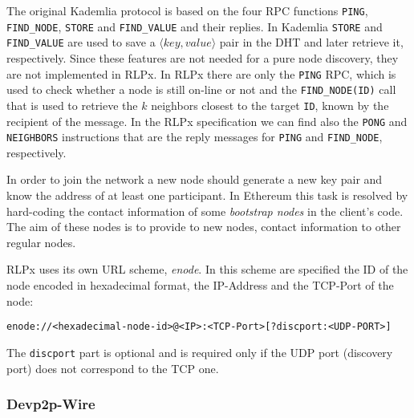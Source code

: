 The original Kademlia protocol is based on the four RPC functions 
\verb|PING|, \verb|FIND_NODE|,
\verb|STORE| and \verb|FIND_VALUE| and their replies.
In Kademlia \verb|STORE| and \verb|FIND_VALUE| are used to save a 
$\langle key, value\rangle$ pair in the DHT and later retrieve it, respectively.
Since these features are not needed for a pure node discovery, they
are not implemented in RLPx.
In RLPx there are only the \verb|PING| RPC, which is used to check whether a
node is still on-line or not and the \verb|FIND_NODE(ID)| call that is used to
retrieve the $k$ neighbors closest to the target \verb|ID|, known by the
recipient of the message. In the RLPx specification we can find also 
the \verb|PONG| and \verb|NEIGHBORS| instructions that are the reply messages
for \verb|PING| and \verb|FIND_NODE|, respectively.

In order to join the network a new node should generate a new key pair and
know the address of at least one participant.
In Ethereum this task is resolved by hard-coding the contact information
of some \textit{bootstrap nodes} in the client's code.
The aim of these nodes is to provide to new nodes, contact information to
other regular nodes.

RLPx uses its own URL scheme, \emph{enode}.
In this scheme are specified the ID of the node encoded in hexadecimal format,
the IP-Address and the TCP-Port of the node: 
\begin{verbatim}
enode://<hexadecimal-node-id>@<IP>:<TCP-Port>[?discport:<UDP-PORT>]
\end{verbatim} 
The \verb|discport| part is optional and is required only if the
UDP port (discovery port) does not correspond to the TCP one.


\subsubsection{Devp2p-Wire}

